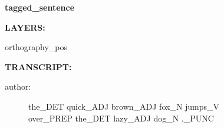 \documentclass{article}
\newcommand{\turn}[2]{
\item[#1:] #2
}
\begin{document}
\begin{center}\textbf{tagged\_sentence}\end{center}

\textbf{LAYERS:}

orthography\_pos

\textbf{TRANSCRIPT:}

\begin{description}

\turn{author}{the\_DET quick\_ADJ brown\_ADJ fox\_N jumps\_V\\
over\_PREP the\_DET lazy\_ADJ dog\_N .\_PUNC}


\end{description}
\end{document}
